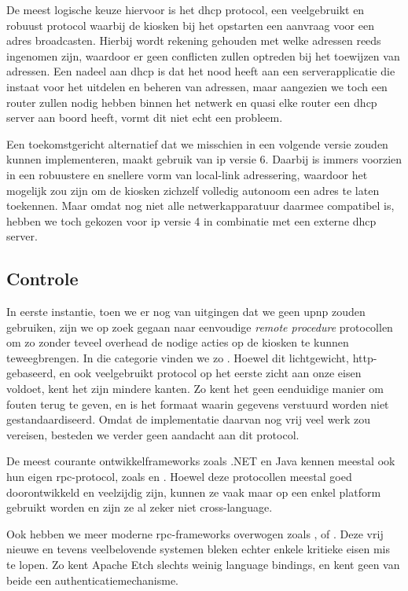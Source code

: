 De meest logische keuze hiervoor is het \ac{dhcp} protocol, een veelgebruikt en robuust protocol waarbij de kiosken bij het opstarten een aanvraag voor een adres broadcasten. Hierbij wordt rekening gehouden met welke adressen reeds ingenomen zijn, waardoor er geen conflicten zullen optreden bij het toewijzen van adressen. Een nadeel aan \ac{dhcp} is dat het nood heeft aan een serverapplicatie die instaat voor het uitdelen en beheren van adressen, maar aangezien we toch een router zullen nodig hebben binnen het netwerk en quasi elke router een \ac{dhcp} server aan boord heeft, vormt dit niet echt een probleem.

Een toekomstgericht alternatief dat we misschien in een volgende versie zouden kunnen implementeren, maakt gebruik van \ac{ip} versie 6. Daarbij is immers voorzien in een robuustere en snellere vorm van local-link adressering, waardoor het mogelijk zou zijn om de kiosken zichzelf volledig autonoom een adres te laten toekennen. Maar omdat nog niet alle netwerkapparatuur daarmee compatibel is, hebben we toch gekozen voor \ac{ip} versie 4 in combinatie met een externe \ac{dhcp} server.

\subsection{Controle}

In eerste instantie, toen we er nog van uitgingen dat we geen \ac{upnp} zouden gebruiken, zijn we op zoek gegaan naar eenvoudige \emph{remote procedure} protocollen om zo zonder teveel overhead de nodige acties op de kiosken te kunnen teweegbrengen. In die categorie vinden we zo . Hoewel dit lichtgewicht, \ac{http}-gebaseerd, en ook veelgebruikt protocol op het eerste zicht aan onze eisen voldoet, kent het zijn mindere kanten. Zo kent het geen eenduidige manier om fouten terug te geven, en is het formaat waarin gegevens verstuurd worden niet gestandaardiseerd. Omdat de implementatie daarvan nog vrij veel werk zou vereisen, besteden we verder geen aandacht aan dit protocol.

De meest courante ontwikkelframeworks zoals .NET en Java kennen meestal ook hun eigen \ac{rpc}-protocol, zoals  en . Hoewel deze protocollen meestal goed doorontwikkeld en veelzijdig zijn, kunnen ze vaak maar op een enkel platform gebruikt worden en zijn ze al zeker niet cross-language.

Ook hebben we meer moderne \ac{rpc}-frameworks overwogen zoals , of . Deze vrij nieuwe en tevens veelbelovende systemen bleken echter enkele kritieke eisen mis te lopen. Zo kent Apache Etch slechts weinig language bindings, en kent geen van beide een authenticatiemechanisme.

